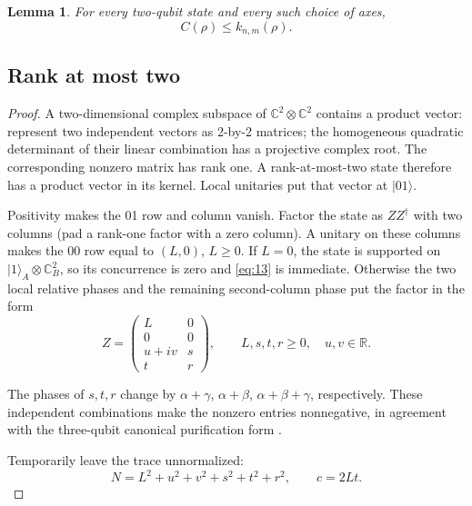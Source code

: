 \documentclass[10pt,letterpaper]{article}
\newtheorem{lemma}{Lemma}
\begin{document}
\begin{lemma}\label{lem:concurrence} For every two-qubit state and every such choice of axes,
\begin{equation}
\boxed{C(\rho)\le k_{n,m}(\rho).}
\label{eq:13}
\end{equation}

\end{lemma}

\subsection{Rank at most two}

\begin{proof}

A two-dimensional complex subspace of \(\mathbb C^2\otimes\mathbb C^2\) contains a product vector: represent two independent vectors as 2-by-2 matrices; the homogeneous quadratic determinant of their linear combination has a projective complex root. The corresponding nonzero matrix has rank one. A rank-at-most-two state therefore has a product vector in its kernel. Local unitaries put that vector at \(|01\rangle\).

Positivity makes the 01 row and column vanish. Factor the state as \(ZZ^\dagger\) with two columns (pad a rank-one factor with a zero column). A unitary on these columns makes the 00 row equal to \((L,0)\), \(L\ge0\). If \(L=0\), the state is supported on \(|1\rangle_A\otimes\mathbb C^2_B\), so its concurrence is zero and \eqref{eq:13} is immediate. Otherwise the two local relative phases and the remaining second-column phase put the factor in the form
\begin{equation}
Z=\begin{pmatrix}L&0\\0&0\\u+iv&s\\t&r\end{pmatrix},
\qquad L,s,t,r\ge0,\quad u,v\in\mathbb R.
\label{eq:14}
\end{equation}

The phases of \(s,t,r\) change by \(\alpha+\gamma\), \(\alpha+\beta\), \(\alpha+\beta+\gamma\), respectively. These independent combinations make the nonzero entries nonnegative, in agreement with the three-qubit canonical purification form \cite{ref4}.

Temporarily leave the trace unnormalized:
\begin{equation*}
N=L^2+u^2+v^2+s^2+t^2+r^2,\qquad c=2Lt.
\end{equation*}


\end{proof}
\end{document}
